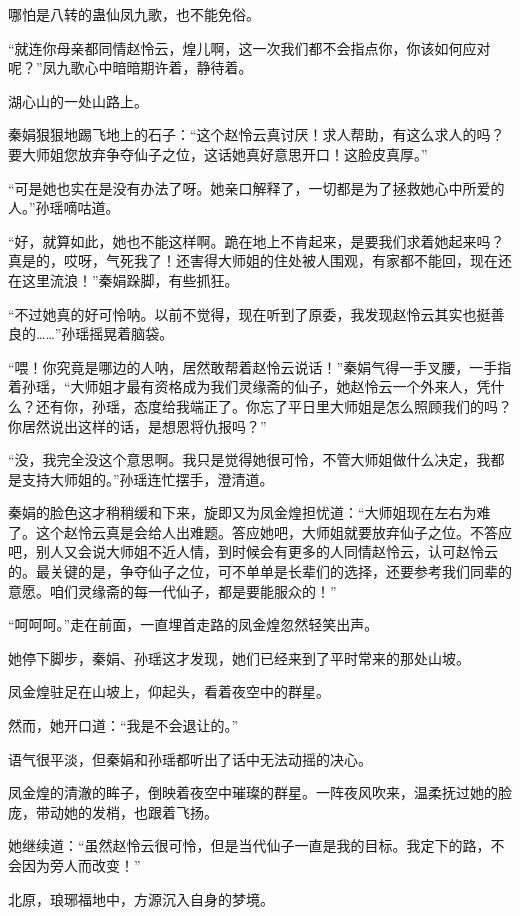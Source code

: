 \begin{this_body}
哪怕是八转的蛊仙凤九歌，也不能免俗。

“就连你母亲都同情赵怜云，煌儿啊，这一次我们都不会指点你，你该如何应对呢？”凤九歌心中暗暗期许着，静待着。

湖心山的一处山路上。

秦娟狠狠地踢飞地上的石子：“这个赵怜云真讨厌！求人帮助，有这么求人的吗？要大师姐您放弃争夺仙子之位，这话她真好意思开口！这脸皮真厚。”

“可是她也实在是没有办法了呀。她亲口解释了，一切都是为了拯救她心中所爱的人。”孙瑶嘀咕道。

“好，就算如此，她也不能这样啊。跪在地上不肯起来，是要我们求着她起来吗？真是的，哎呀，气死我了！还害得大师姐的住处被人围观，有家都不能回，现在还在这里流浪！”秦娟跺脚，有些抓狂。

“不过她真的好可怜呐。以前不觉得，现在听到了原委，我发现赵怜云其实也挺善良的……”孙瑶摇晃着脑袋。

“喂！你究竟是哪边的人呐，居然敢帮着赵怜云说话！”秦娟气得一手叉腰，一手指着孙瑶，“大师姐才最有资格成为我们灵缘斋的仙子，她赵怜云一个外来人，凭什么？还有你，孙瑶，态度给我端正了。你忘了平日里大师姐是怎么照顾我们的吗？你居然说出这样的话，是想恩将仇报吗？”

“没，我完全没这个意思啊。我只是觉得她很可怜，不管大师姐做什么决定，我都是支持大师姐的。”孙瑶连忙摆手，澄清道。

秦娟的脸色这才稍稍缓和下来，旋即又为凤金煌担忧道：“大师姐现在左右为难了。这个赵怜云真是会给人出难题。答应她吧，大师姐就要放弃仙子之位。不答应吧，别人又会说大师姐不近人情，到时候会有更多的人同情赵怜云，认可赵怜云的。最关键的是，争夺仙子之位，可不单单是长辈们的选择，还要参考我们同辈的意愿。咱们灵缘斋的每一代仙子，都是要能服众的！”

“呵呵呵。”走在前面，一直埋首走路的凤金煌忽然轻笑出声。

她停下脚步，秦娟、孙瑶这才发现，她们已经来到了平时常来的那处山坡。

凤金煌驻足在山坡上，仰起头，看着夜空中的群星。

然而，她开口道：“我是不会退让的。”

语气很平淡，但秦娟和孙瑶都听出了话中无法动摇的决心。

凤金煌的清澈的眸子，倒映着夜空中璀璨的群星。一阵夜风吹来，温柔抚过她的脸庞，带动她的发梢，也跟着飞扬。

她继续道：“虽然赵怜云很可怜，但是当代仙子一直是我的目标。我定下的路，不会因为旁人而改变！”

北原，琅琊福地中，方源沉入自身的梦境。


\end{this_body}
